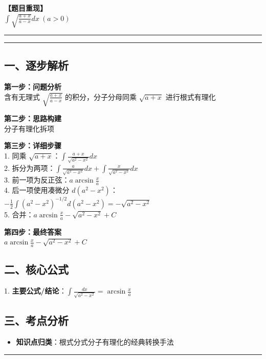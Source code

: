 ﻿\documentclass[12pt, a4paper]{ctexart}
\newcommand{\TopSeparator}{
    \par\noindent\rule{\textwidth}{1.5pt}\vspace{0.5em}
}
\newcommand{\AnalysisSeparator}{
    \par\noindent\rule{\textwidth}{0.5pt}\vspace{0.2em}\hrule\vspace{0.5em}
}
\newenvironment{RedAnalysis}{
    \par
    \color{red} 
}{
    \par
    \color{black} 
}
\begin{document}
\textbf{【题目重现】} \\
$\int \sqrt{\frac{a+x}{a-x}} dx \ (a>0)$

\AnalysisSeparator

\begin{RedAnalysis}

	\subsection*{一、逐步解析}

	\textbf{第一步：问题分析} \\
	含有无理式 $\sqrt{\frac{a+x}{a-x}}$ 的积分，分子分母同乘 $\sqrt{a+x}$ 进行根式有理化

	\textbf{第二步：思路构建} \\
	分子有理化拆项

	\textbf{第三步：详细步骤} \\
	1. 同乘 $\sqrt{a+x}$：$\int \frac{a+x}{\sqrt{a^2-x^2}} dx$ \\ 
	2. 拆分为两项：$\int \frac{a}{\sqrt{a^2-x^2}} dx + \int \frac{x}{\sqrt{a^2-x^2}} dx$ \\ 
	3. 前一项为反正弦：$a \arcsin \frac{x}{a}$ \\ 
	4. 后一项使用凑微分 $d(a^2-x^2)$：$-\frac{1}{2} \int (a^2-x^2)^{-1/2} d(a^2-x^2) = -\sqrt{a^2-x^2}$ \\ 
	5. 合并：$a \arcsin \frac{x}{a} - \sqrt{a^2-x^2} + C$

	\textbf{第四步：最终答案} \\
	$a \arcsin \frac{x}{a} - \sqrt{a^2-x^2} + C$

	\subsection*{二、核心公式}
	1. \textbf{主要公式/结论}：$\int \frac{dx}{\sqrt{a^2-x^2}} = \arcsin \frac{x}{a}$

	\subsection*{三、考点分析}
	\begin{itemize}
		\item \textbf{知识点归类}：根式分式分子有理化的经典转换手法
	\end{itemize}

\end{RedAnalysis}

\vspace{2em}

\TopSeparator
\end{document}
